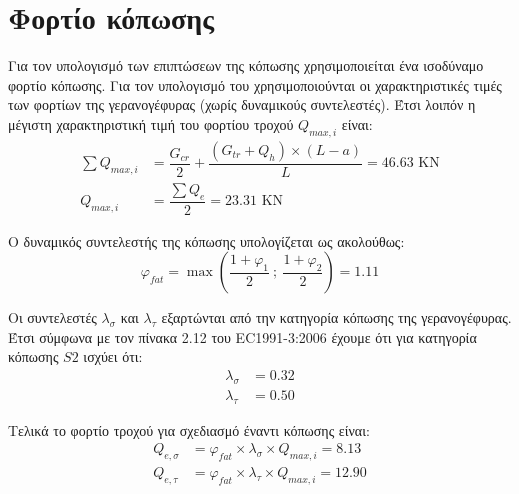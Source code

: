 \section{Φορτίο κόπωσης}
Για τον υπολογισμό των επιπτώσεων της κόπωσης χρησιμοποιείται ένα ισοδύναμο φορτίο κόπωσης. Για τον υπολογισμό του χρησιμοποιούνται οι χαρακτηριστικές τιμές των φορτίων της γερανογέφυρας (χωρίς δυναμικούς συντελεστές). Έτσι λοιπόν η μέγιστη χαρακτηριστική τιμή του φορτίου τροχού  $Q_{max,i}$ είναι:
\begin{align*}
\sum{Q_{max,i}}     &= \dfrac{G_{cr}}{2} + \dfrac{(G_{tr} + Q_h) \times (L - a)}{L}   =  46.63 \text{ KN} \\
Q_{max,i}           &= \dfrac{\displaystyle\sum{Q_e}}{2}                               =  23.31  \text{ KN}
\end{align*}

Ο δυναμικός συντελεστής της κόπωσης υπολογίζεται ως ακολούθως:
\begin{equation*}
φ_{fat} = \max \left( \dfrac{1+φ_1}{2}\ ; \ \dfrac{1+φ_2}{2} \right) =  1.11
\end{equation*}

Οι συντελεστές $λ_σ$ και $λ_τ$ εξαρτώνται από την κατηγορία κόπωσης της γερανογέφυρας. Έτσι σύμφωνα με τον πίνακα 2.12 του EC1991-3:2006 έχουμε ότι για κατηγορία κόπωσης $S2$ ισχύει ότι:
\begin{align*}
λ_σ	&=   0.32\\
λ_τ	&=   0.50
\end{align*}

Τελικά το φορτίο τροχού για σχεδιασμό έναντι κόπωσης είναι:
\begin{align*}
Q_{e,σ} &= φ_{fat} \times λ_σ \times Q_{max,i} =   8.13\\
Q_{e,τ}	 &= φ_{fat} \times λ_τ \times Q_{max,i} =  12.90
\end{align*}
